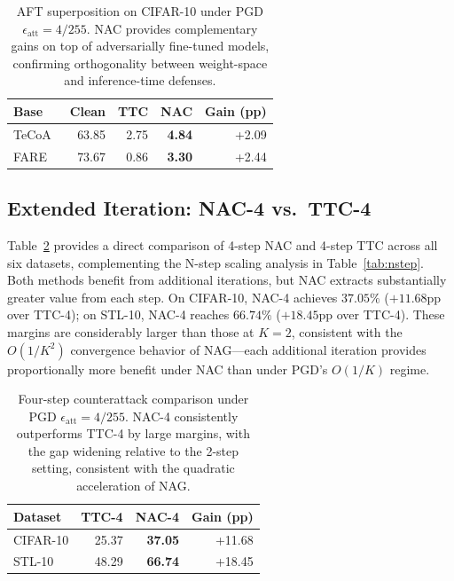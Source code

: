 \documentclass[12pt,a4paper]{article}
\begin{document}
\begin{table}[ht]\centering\small
\caption{AFT superposition on CIFAR-10 under PGD $\epsilon_{\text{att}}=4/255$. NAC provides complementary gains on top of adversarially fine-tuned models, confirming orthogonality between weight-space and inference-time defenses.}\label{tab:aft}
\begin{tabular}{@{}lrrrr@{}}
\toprule Base & Clean & TTC & NAC & Gain (pp) \\
\midrule TeCoA~\cite{mao2023understanding} & 63.85 & 2.75 & \textbf{4.84} & +2.09 \\
FARE~\cite{schlarmann2024robust} & 73.67 & 0.86 & \textbf{3.30} & +2.44 \\
\bottomrule
\end{tabular}
\end{table}

\subsection{Extended Iteration: NAC-4 vs.\ TTC-4}

Table~\ref{tab:nac4} provides a direct comparison of 4-step NAC and 4-step TTC across all six datasets, complementing the N-step scaling analysis in Table~\ref{tab:nstep}. Both methods benefit from additional iterations, but NAC extracts substantially greater value from each step. On CIFAR-10, NAC-4 achieves $37.05\%$ ($+11.68$pp over TTC-4); on STL-10, NAC-4 reaches $66.74\%$ ($+18.45$pp over TTC-4). These margins are considerably larger than those at $K=2$, consistent with the $O(1/K^2)$ convergence behavior of NAG---each additional iteration provides proportionally more benefit under NAC than under PGD's $O(1/K)$ regime.

\begin{table}[ht]\centering\small
\caption{Four-step counterattack comparison under PGD $\epsilon_{\text{att}}=4/255$. NAC-4 consistently outperforms TTC-4 by large margins, with the gap widening relative to the 2-step setting, consistent with the quadratic acceleration of NAG.}\label{tab:nac4}
\begin{tabular}{@{}lrrr@{}}
\toprule Dataset & TTC-4 & NAC-4 & Gain (pp) \\
\midrule CIFAR-10 & 25.37 & \textbf{37.05} & +11.68 \\
STL-10 & 48.29 & \textbf{66.74} & +18.45 \\
\bottomrule
\end{tabular}
\end{table}
\end{document}
